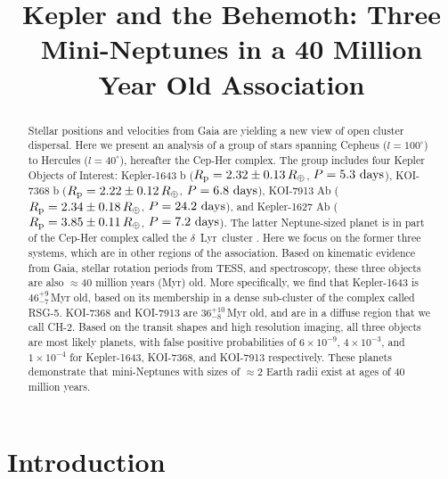\documentclass[12pt,twocolumn,tighten,linenumbers]{aastex63}
\begin{document}
\title{
  Kepler and the Behemoth: Three Mini-Neptunes in a 40 Million Year Old Association
}



\begin{abstract}
  Stellar positions and velocities from Gaia are yielding a new view
  of open cluster dispersal.  
  Here we present an analysis of a group
  of stars spanning Cepheus ($l=100^\circ$) to Hercules ($l=40^\circ$),
  hereafter the Cep-Her complex.  The group includes four Kepler
  Objects of Interest:
  Kepler-1643 b ($R_{\rm p} = 2.32 \pm 0.13\,R_\oplus$, $P = 5.3\ {\rm days}$),
  KOI-7368 b ($R_{\rm p} = 2.22 \pm 0.12\,R_\oplus$, $P = 6.8\ {\rm days}$), 
  KOI-7913 Ab ($R_{\rm p} = 2.34 \pm 0.18\,R_\oplus$, $P = 24.2\ {\rm days}$), and
  Kepler-1627 Ab ($R_{\rm p} = 3.85 \pm 0.11\,R_\oplus$, $P = 7.2\ {\rm days}$).
  The latter Neptune-sized planet is in part of the Cep-Her complex
  called the $\delta$\ Lyr\ cluster \citep{bouma_kep1627_2022}.  Here
  we focus on the former three systems, which are in other regions of
  the association.  Based on kinematic evidence from Gaia, stellar
  rotation periods from TESS, and spectroscopy, these three objects
  are also $\approx$40 million years (Myr) old.  More specifically, we
  find that Kepler-1643 is $46^{+9}_{-7}$\,Myr old, based on its
  membership in a dense sub-cluster of the complex called RSG-5.
  KOI-7368 and KOI-7913 are $36^{+10}_{-8}$\,Myr old, and are in a
  diffuse region that we call CH-2.  Based on the transit shapes and
  high resolution imaging, all three objects are most likely planets,
  with false positive probabilities of $6\times10^{-9}$,
  $4\times10^{-3}$, and $1\times10^{-4}$ for Kepler-1643, KOI-7368,
  and KOI-7913 respectively.  These planets demonstrate
  that mini-Neptunes with sizes of $\approx$2 Earth radii exist at ages
  of 40 million years.
\end{abstract}



\section{Introduction}
\end{document}
